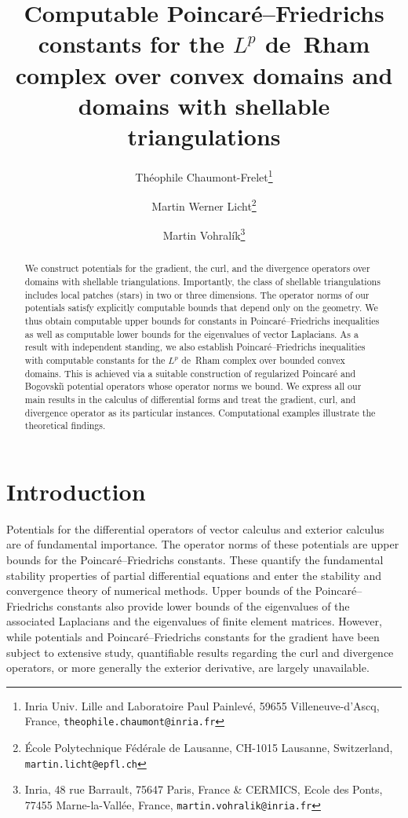 \documentclass[10pt,a4paper]{article}
\title{Computable Poincar\'e--Friedrichs constants for the $L^{p}$ de~Rham complex over convex domains and domains with shellable triangulations}
\author{
    Th\'eophile Chaumont-Frelet\thanks{Inria Univ. Lille and Laboratoire Paul Painlev\'e, 59655 Villeneuve-d'Ascq, France, \texttt{theophile.chaumont@inria.fr}} \and
    Martin Werner Licht\thanks{\'Ecole Polytechnique F\'ed\'erale de Lausanne, CH-1015 Lausanne, Switzerland, \texttt{martin.licht@epfl.ch}} \and
    Martin Vohral\'ik\thanks{Inria, 48 rue Barrault, 75647 Paris, France \& CERMICS, Ecole des Ponts, 77455 Marne-la-Vall\'ee, France, \texttt{martin.vohralik@inria.fr}}
}
\date{}
\begin{document}
\maketitle

\begin{abstract}
    We construct potentials for the gradient, the curl, and the divergence operators over domains with shellable triangulations. 
    Importantly, the class of shellable triangulations includes local patches (stars) in two or three dimensions. 
    The operator norms of our potentials satisfy explicitly computable bounds that depend only on the geometry. 
    We thus obtain computable upper bounds for constants in Poincar\'e--Friedrichs inequalities as well as computable lower bounds for the eigenvalues of vector Laplacians. 
    As a result with independent standing, we also establish Poincar\'e--Friedrichs inequalities with computable constants for the $L^{p}$ de~Rham complex over bounded convex domains. 
    This is achieved via a suitable construction of regularized Poincar\'e and Bogovski\u{\i} potential operators whose operator norms we bound.
    We express all our main results in the calculus of differential forms and treat the gradient, curl, and divergence operator as its particular instances. 
    Computational examples illustrate the theoretical findings.
\end{abstract}


 



\section{Introduction}\label{section:intro}

Potentials for the differential operators of vector calculus and exterior calculus are of fundamental importance. 
The operator norms of these potentials are upper bounds for the Poincar\'e--Friedrichs constants.
These quantify the fundamental stability properties of partial differential equations
and enter the stability and convergence theory of numerical methods. 
Upper bounds of the Poincar\'e--Friedrichs constants also provide lower bounds of the eigenvalues of the associated Laplacians and the eigenvalues of finite element matrices. 
However, while potentials and Poincar\'e--Friedrichs constants for the gradient have been subject to extensive study,
quantifiable results regarding the curl and divergence operators, or more generally the exterior derivative, are largely unavailable.
\end{document}
